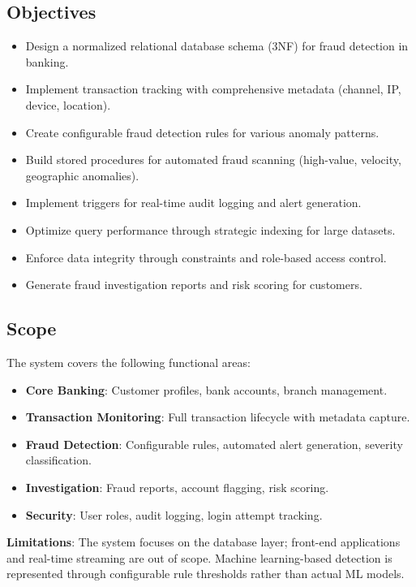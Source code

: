 \documentclass[a4paper,12pt]{article}
\begin{document}
\subsection{Objectives}
\begin{itemize}
    \item Design a normalized relational database schema (3NF) for fraud detection in banking.
    \item Implement transaction tracking with comprehensive metadata (channel, IP, device, location).
    \item Create configurable fraud detection rules for various anomaly patterns.
    \item Build stored procedures for automated fraud scanning (high-value, velocity, geographic anomalies).
    \item Implement triggers for real-time audit logging and alert generation.
    \item Optimize query performance through strategic indexing for large datasets.
    \item Enforce data integrity through constraints and role-based access control.
    \item Generate fraud investigation reports and risk scoring for customers.
\end{itemize}

\subsection{Scope}
The system covers the following functional areas:
\begin{itemize}
    \item \textbf{Core Banking}: Customer profiles, bank accounts, branch management.
    \item \textbf{Transaction Monitoring}: Full transaction lifecycle with metadata capture.
    \item \textbf{Fraud Detection}: Configurable rules, automated alert generation, severity classification.
    \item \textbf{Investigation}: Fraud reports, account flagging, risk scoring.
    \item \textbf{Security}: User roles, audit logging, login attempt tracking.
\end{itemize}
\textbf{Limitations}: The system focuses on the database layer; front-end applications and real-time streaming are out of scope. Machine learning-based detection is represented through configurable rule thresholds rather than actual ML models.
\end{document}
